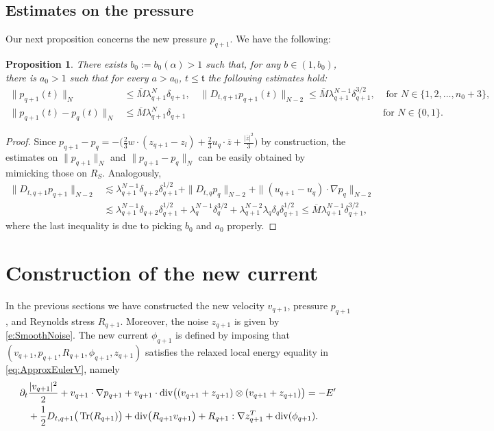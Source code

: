 \documentclass[10pt,a4paper]{amsart}
\numberwithin{equation}{section}
\numberwithin{corollario}{section}
\numberwithin{lemma}{section}
\newtheorem{prop}{Proposition}
\numberwithin{prop}{section}
\theoremstyle{definition}
\theoremstyle{remark}
\newcommand{\dvg}{\mathord{{\rm div}}}
\newcommand{\varz}{\overline{z}}
\DeclareMathOperator{\Tr}{Tr}
\newcommand{\qq}{_{q+1}}
\newcommand{\qqq}{_{q+2}}
\begin{document}
\subsection{Estimates on the pressure}
Our next proposition concerns the new pressure $p\qq$. We have the following:
\begin{prop} \label{lemma:pressure}
There exists $ b_0:=b_0(\alpha)>1$ such that, for any $b\in (1,b_0)$, there is $a_0>1$ such that for every $a>a_0$, $t\le \mathfrak{t}$ the following estimates hold:
    \begin{align}
        \label{est:pq1}\|p\qq(t)\|_N
        &\le \overline{M}\lambda\qq^N\delta\qq,
        \quad 
        \|D_{t,q+1}p\qq(t)\|_{N-2}
        \le \overline{M} \lambda\qq^{N-1}\delta\qq^{3/2},
        &\text{  for }N \in \{1,2,\dots,n_0+3\},\\
        \label{est:varp}\|p\qq(t)-p_q(t)\|_N&\le \overline{M}\lambda\qq^{N}\delta\qq &\text{for }N \in \{0,1\}.
    \end{align}
\end{prop}

\begin{proof}    
    Since $p\qq-p_q=-\Big(\frac{2}{3}w\cdot (z\qq-z_l)+\frac{2}{3}u_q\cdot \varz +\frac{|\varz|^2}{3}\Big)$ by construction, the estimates on $\|p\qq\|_N$ and $\|p\qq-p_q\|_N$ can be easily obtained by mimicking those on $R_S$.
    Analogously,
    \begin{align}
        \|D_{t,q+1}p\qq\|_{N-2}&\lesssim \lambda\qq^{N-1}\delta\qqq\delta\qq^{1/2}+\|D_{t,q}p_q\|_{N-2}+\|(u\qq-u_q)\cdot \nabla p_q\|_{N-2}\\
        &\lesssim \lambda\qq^{N-1}\delta\qqq\delta\qq^{1/2}+\lambda_q^{N-1}\delta_q^{3/2}+\lambda\qq^{N-2}\lambda_q\delta_q\delta\qq^{1/2}\le \overline{M}\lambda\qq^{N-1}\delta\qq^{3/2},
    \end{align}
    where the last inequality is due to picking $b_0$ and $a_0$ properly.
\end{proof}

\section{Construction of the new current} \label{sec:current}
In the previous sections we have constructed the new velocity $v\qq$, pressure $p\qq$, and Reynolds stress $R\qq$. Moreover, the noise $z\qq$ is given by \eqref{e:SmoothNoise}.
The new current $\phi\qq$ is defined by imposing that $(v\qq,p\qq,R\qq,\phi_{q+1},z_{q+1})$ satisfies the relaxed local energy equality in \eqref{eq:ApproxEulerV}, namely
\begin{align}\label{e:LEIq1}
      \partial_t&\frac{|v\qq|^2}{2}
      +
      v\qq\cdot \nabla p\qq
      +
      v\qq \cdot\dvg\big((v\qq+z\qq)\otimes (v\qq+z\qq)\big) = -E'
      \\
      &
      +
      \frac{1}{2}D_{t,q+1}\big(\Tr(R\qq)\big)
      +
      \dvg\big(R\qq v\qq\big)
      +
      R\qq:\nabla z\qq^T 
      +
      \dvg (\phi\qq).
\end{align}
\end{document}
